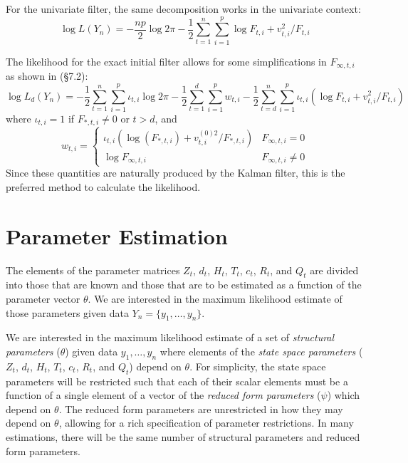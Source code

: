 \documentclass[12pt]{article}
\begin{document}
	For the univariate filter, the same decomposition works in the univariate context:
	\begin{equation} \label{eq:likelihood_uni}
	\log L(Y_n) = -\frac{np}{2} \log 2\pi - \frac{1}{2} \sum_{t=1}^n \sum_{i=1}^p\log F_{t,i}+ v_{t,i}^2 / F_{t,i} 
	\end{equation}
	
	The likelihood for the exact initial filter allows for some simplifications in $F_{\infty,t,i}$ as shown in \cite{dk_book} (\S 7.2):
	\begin{equation} \label{eq:likelihood_uni_diff}
	\log L_d(Y_n) = -\frac{1}{2} \sum_{t=1}^n \sum_{i=1}^p \iota_{t,i} \log 2\pi  - \frac{1}{2}  \sum_{t=1}^d \sum_{i=1}^p w_{t,i} - \frac{1}{2} \sum_{t=d}^n \sum_{i=1}^p \iota_{t,i} \left(\log F_{t,i}+ v_{t,i}^2 / F_{t,i} \right)
	\end{equation}
	where  $\iota_{t,i} = 1$ if $F_{*,t,i} \neq 0$ or $ t > d$, and 
	\begin{equation*}
	w_{t,i} = \begin{cases} 
	   \iota_{t,i} (\log (F_{*,t,i}) + v_{t,i}^{(0)2} / F_{*,t,i}) & F_{\infty,t,i} = 0 \\
	   \log F_{\infty,t,i} & F_{\infty,t,i} \neq 0
	\end{cases} 
	\end{equation*}
	Since these quantities are naturally produced by the Kalman filter, this is the preferred method to calculate the likelihood.

\section{Parameter Estimation}
	\label{sec:parameter_estimation}

	The elements of the parameter matrices $Z_t$, $d_t$, $H_t$, $T_t$, $c_t$, $R_t$, and $Q_t$ are divided into those that are known and those that are to be estimated as a function of the parameter vector $\theta$. We are interested in the maximum likelihood estimate of those parameters given data $Y_n = \{y_1, \dots, y_n\}$. 

	We are interested in the maximum likelihood estimate of a set of \emph{structural parameters} ($\theta$) given data $y_1, \dots, y_n$ where elements of the \emph{state space parameters} ($Z_t$, $d_t$, $H_t$, $T_t$, $c_t$, $R_t$, and $Q_t$) depend on $\theta$. For simplicity, the state space parameters will be restricted such that each of their scalar elements must be a function of a single element of a vector of the \emph{reduced form parameters} ($\psi$) which depend on $\theta$. The reduced form parameters are unrestricted in how they may depend on $\theta$, allowing for a rich specification of parameter restrictions. In many estimations, there will be the same number of structural parameters and reduced form parameters. 
\end{document}
